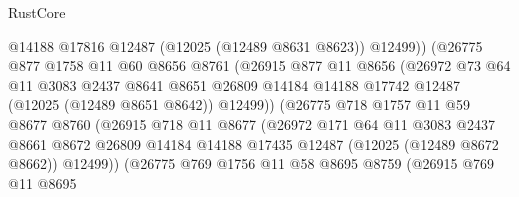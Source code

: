 \begin{lexlean}{RustCore}
\begin{coremodule}
                              @14188
                              @17816
                              @12487
                              (@12025 (@12489 @8631 @8623))
                              @12499))
                          (@26775
                            @877
                            @1758
                            @11
                            @60
                            @8656
                            @8761
                            (@26915
                              @877
                              @11
                              @8656
                              (@26972
                                @73
                                @64
                                @11
                                @3083
                                @2437
                                @8641
                                @8651
                                @26809
                                @14184
                                @14188
                                @17742
                                @12487
                                (@12025 (@12489 @8651 @8642))
                                @12499))
                            (@26775
                              @718
                              @1757
                              @11
                              @59
                              @8677
                              @8760
                              (@26915
                                @718
                                @11
                                @8677
                                (@26972
                                  @171
                                  @64
                                  @11
                                  @3083
                                  @2437
                                  @8661
                                  @8672
                                  @26809
                                  @14184
                                  @14188
                                  @17435
                                  @12487
                                  (@12025 (@12489 @8672 @8662))
                                  @12499))
                              (@26775
                                @769
                                @1756
                                @11
                                @58
                                @8695
                                @8759
                                (@26915
                                  @769
                                  @11
                                  @8695

\end{coremodule}
\end{lexlean}
